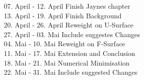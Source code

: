 \documentclass[a4paper,10pt]{article}
\begin{document}
07. April - 12. April  \hspace{1cm} Finish Jaynes chapter \\

13. April - 19. April  \hspace{1cm} Finish Background \\

20. April - 26. April  \hspace{1cm} Reweight on U-Surface \\

27. April - 03. Mai    \hspace{1cm} Include suggestes Changes \\

04. Mai - 10. Mai    \hspace{1cm} Reweight on F-Surface \\

11. Mai - 17. Mai    \hspace{1cm} Extension and Conclusion \\

18. Mai - 21. Mai  \hspace{1cm} Numerical Minimisation  \\

22. Mai - 31. Mai   \hspace{1cm} Include suggested Changes \\
\end{document}
